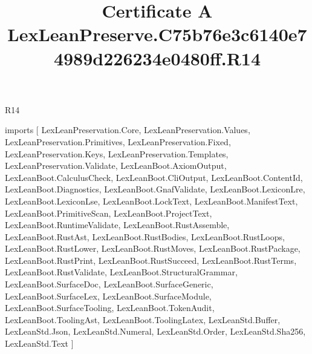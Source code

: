 \begin{lexlean}{R14}
\title{Certificate A LexLeanPreserve.C75b76e3c6140e74989d226234e0480ff.R14}
\begin{coremodule}
imports [
  LexLeanPreservation.Core,
  LexLeanPreservation.Values,
  LexLeanPreservation.Primitives,
  LexLeanPreservation.Fixed,
  LexLeanPreservation.Keys,
  LexLeanPreservation.Templates,
  LexLeanPreservation.Validate,
  LexLeanBoot.AxiomOutput,
  LexLeanBoot.CalculusCheck,
  LexLeanBoot.CliOutput,
  LexLeanBoot.ContentId,
  LexLeanBoot.Diagnostics,
  LexLeanBoot.GnafValidate,
  LexLeanBoot.LexiconLre,
  LexLeanBoot.LexiconLse,
  LexLeanBoot.LockText,
  LexLeanBoot.ManifestText,
  LexLeanBoot.PrimitiveScan,
  LexLeanBoot.ProjectText,
  LexLeanBoot.RuntimeValidate,
  LexLeanBoot.RustAssemble,
  LexLeanBoot.RustAst,
  LexLeanBoot.RustBodies,
  LexLeanBoot.RustLoops,
  LexLeanBoot.RustLower,
  LexLeanBoot.RustMoves,
  LexLeanBoot.RustPackage,
  LexLeanBoot.RustPrint,
  LexLeanBoot.RustSucceed,
  LexLeanBoot.RustTerms,
  LexLeanBoot.RustValidate,
  LexLeanBoot.StructuralGrammar,
  LexLeanBoot.SurfaceDoc,
  LexLeanBoot.SurfaceGeneric,
  LexLeanBoot.SurfaceLex,
  LexLeanBoot.SurfaceModule,
  LexLeanBoot.SurfaceTooling,
  LexLeanBoot.TokenAudit,
  LexLeanBoot.ToolingAst,
  LexLeanBoot.ToolingLatex,
  LexLeanStd.Buffer,
  LexLeanStd.Json,
  LexLeanStd.Numeral,
  LexLeanStd.Order,
  LexLeanStd.Sha256,
  LexLeanStd.Text
]


\end{coremodule}
\end{lexlean}
